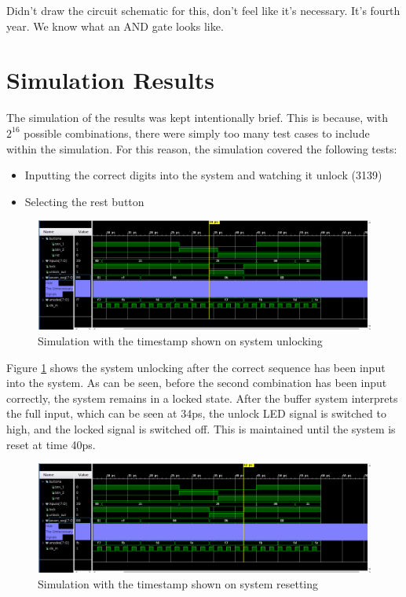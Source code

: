 \documentclass[12pt,a4paper]{article}
\begin{document}
Didn't draw the circuit schematic for this, don't feel like it's necessary. It's fourth year. We know what an AND gate looks like.

\section{Simulation Results}

The simulation of the results was kept intentionally brief. This is because, with $2^{16}$ possible combinations, there were simply too many test cases to include within the simulation. For this reason, the simulation covered the following tests:

\begin{itemize}
    \item Inputting the correct digits into the system and watching it unlock (3139)
    \item Selecting the rest button
\end{itemize}

\begin{figure}[H]
    \centering
    \includegraphics[scale=0.25]{images/sim_unlock.png}
    \caption{Simulation with the timestamp shown on system unlocking}
    \label{fig:sim_unlock}
\end{figure}

Figure \ref{fig:sim_unlock} shows the system unlocking after the correct sequence has been input into the system. As can be seen, before the second combination has been input correctly, the system remains in a locked state. After the buffer system interprets the full input, which can be seen at 34ps, the unlock LED signal is switched to high, and the locked signal is switched off. This is maintained until the system is reset at time 40ps.

\begin{figure}[H]
    \centering
    \includegraphics[scale=0.25]{images/sim_reset.png}
    \caption{Simulation with the timestamp shown on system resetting}
    \label{fig:sim_reset}
\end{figure}
\end{document}

